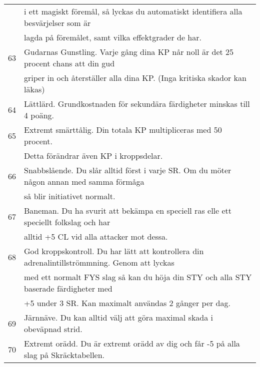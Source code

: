 \documentclass[a4paper, 10pt, titlepage]{article}
\begin{document}
\begin{table}[hbp]
\begin{tabular}{|l|l|}
   ~         & i ett magiskt föremål, så lyckas du automatiskt identifiera alla besvärjelser som är  \\
   ~         & lagda på föremålet, samt vilka effektgrader de har. \\
   63        & Gudarnas Gunstling. Varje gång dina KP når noll är det 25 procent chans att din gud  \\
   ~         & griper in och återställer alla dina KP. (Inga kritiska skador kan läkas) \\
   64        & Lättlärd.  Grundkostnaden för sekundära färdigheter minskas till 4 poäng. \\
   65        & Extremt smärttålig. Din totala KP multipliceras med 50 procent. \\
   ~         & Detta förändrar även KP i kroppsdelar. \\
   66        & Snabbslående. Du slår alltid först i varje SR. Om du möter någon annan med samma förmåga \\
   ~         & så blir initiativet normalt. \\
   67        & Baneman. Du ha svurit att bekämpa en speciell ras elle ett speciellt folkslag och har  \\
   ~         & alltid +5 CL vid alla attacker mot dessa. \\
   68        & God kroppskontroll. Du har lätt att kontrollera din adrenalintillströmmning. Genom att lyckas \\
   ~         & med ett normalt FYS slag så kan du höja din STY och alla STY baserade färdigheter med  \\
   ~         & +5 under 3 SR. Kan maximalt användas 2 gånger per dag. \\
   69        & Järnnäve. Du kan alltid välj att göra  maximal skada i obeväpnad strid. \\
   70        & Extremt orädd. Du är extremt orädd av dig och får -5 på alla slag på Skräcktabellen. \\
 \end{tabular}
\end{table}
\end{document}
